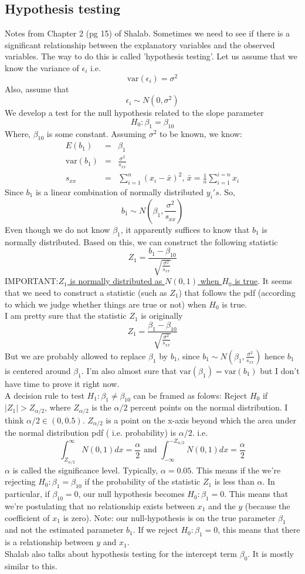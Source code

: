 \documentclass{article}
\newcommand{\beq}{\begin{equation}}
\newcommand{\eeq}{\end{equation}}
\newcommand{\ber}{\begin{eqnarray}}
\newcommand{\eer}{\end{eqnarray}}
\begin{document}
\subsection{Hypothesis testing}
Notes from Chapter 2 (pg 15) of Shalab. Sometimes we need to see if there is a significant relationship between the explanatory variables and the observed variables. The way to do this is called 'hypothesis testing'. Let us assume that we know the variance of $\epsilon_i$ i.e.
\beq
\text{var}(\epsilon_i) = \sigma^2
\eeq
Also, assume that
\beq
\epsilon_i \sim N(0,\sigma^2)
\eeq
We develop a test for the null hypothesis related to the slope parameter
\beq
H_0:\beta_1 = \beta_{10}
\eeq
Where, $\beta_{10}$ is some constant. Assuming $\sigma^2$ to be known, we know:
\ber
E(b_1)&=&\beta_1 \\
\text{var}(b_1) &=& \frac{\sigma^2}{s_{xx}}\\
s_{xx} &=& \sum_{i=1}^{n}(x_i - \bar{x})^2,\,\bar{x} = \frac{1}{n}\sum_{i=1}^{i=n}x_i
\eer
Since $b_1$ is a linear combination of normally distributed $y_i's$. So,
\beq
b_1 \sim N(\beta_1,\frac{\sigma^2}{s_{xx}})  
\eeq
Even though we do not know $\beta_1$, it apparently suffices to know that $b_1$ is normally distributed. Based on this, we can construct the following statistic
\beq
Z_1 = \frac{b_1-\beta_{10}}{\sqrt{\frac{\sigma^2}{s_{xx}}}}
\eeq
IMPORTANT:\underline{$Z_1$ is normally distributed as $N(0,1)$ when $H_0$ is true}. It seems that we need to construct a statistic (such as $Z_1$) that follows the pdf (according to which we judge whether things are true or not) when $H_0$ is true.\\
I am pretty sure that the statistic $Z_1$ is originally 
\beq
Z_1 = \frac{\beta_1-\beta_{10}}{\sqrt{\frac{\sigma^2}{s_{xx}}}}
\eeq
But we are probably allowed to replace $\beta_1$ by $b_1$, since $b_1 \sim N(\beta_1,\frac{\sigma^2}{s_{xx}})$ hence $b_1$ is centered around $\beta_1$. I'm also almost sure that $\text{var}(\beta_1)=\text{var}(b_1)$ but I don't have time to prove it right now.\\
A decision rule to test $H_1:\beta_1 \neq \beta_{10}$ can be framed as folows:
Reject $H_0$ if $|Z_1| > Z_{\alpha/2}$, where $Z_{\alpha/2}$ is the $\alpha/2$ percent points on the normal distribution. I think $\alpha/2 \in(0,0.5)$. $Z_{\alpha/2}$ is a point on the x-axis beyond which the area under the normal distribution pdf ( i.e. probability) is $\alpha/2$. i.e.
\beq
\int_{Z_{\alpha/2}}^{\infty}N(0,1)dx = \frac{\alpha}{2} \text{ and } \int_{-\infty}^{-Z_{\alpha/2}}N(0,1)dx = \frac{\alpha}{2}
\eeq
$\alpha$ is called the significance level. Typically, $\alpha = 0.05$. This means if the we're rejecting $H_0:\beta_1 = \beta_{10}$ if the probability of the statistic $Z_1$ is less than $\alpha$. In particular, if $\beta_{10}=0$, our null hypothesis becomes $H_0:\beta_1 = 0$. This means that we're postulating that no relationship exists between $x_1$ and the $y$ (because the coefficient of $x_1$ is zero). Note: our null-hypothesis is on the true parameter $\beta_1$ and not the estimated parameter $b_1$. If we reject  $H_0:\beta_1 = 0$, this means that there is a relationship between $y$ and $x_1$.\\
Shalab also talks about hypothesis testing for the intercept term $\beta_0$. It is mostly similar to this.
%
%
%
\end{document}
